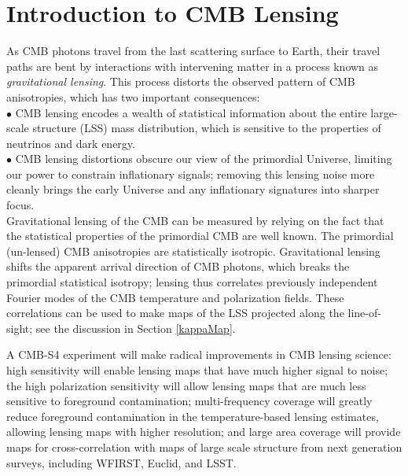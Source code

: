 \section{Introduction to CMB Lensing}
\label{sec:lensing_intro}

As CMB photons travel from the last scattering surface to Earth, their travel paths are bent by interactions with intervening matter in a process known as \textit{gravitational lensing}.
This process distorts the observed pattern of CMB anisotropies, which has two important consequences:\\
 
$\bullet$ CMB lensing encodes a wealth of statistical information about the entire large-scale structure (LSS) mass distribution, which is sensitive to the properties of neutrinos and dark energy.\\

$\bullet$ CMB lensing distortions obscure our view of the primordial Universe, limiting our power to constrain inflationary signals; removing this lensing noise more cleanly brings the early Universe and any inflationary signatures into sharper focus.\\


Gravitational lensing of the CMB can be measured by relying on the fact that the statistical properties of the primordial CMB are well known.
The primordial (un-lensed) CMB anisotropies are statistically isotropic.
Gravitational lensing shifts the apparent arrival direction of CMB photons, which breaks the primordial statistical isotropy;
lensing thus correlates previously independent Fourier modes of the CMB temperature and polarization fields.
These correlations can be used to make maps of the LSS projected along the line-of-sight; see the discussion in Section \ref{kappaMap}.

A CMB-S4 experiment will make radical improvements in CMB lensing science:
high sensitivity will enable lensing maps that have much higher signal to
noise; the high polarization sensitivity will allow
lensing maps that are much less sensitive to foreground contamination;
multi-frequency coverage will greatly reduce foreground 
contamination in the temperature-based lensing estimates, 
allowing lensing maps with higher resolution; and
large area coverage will provide maps for cross-correlation with maps of large
scale structure from next generation surveys, including WFIRST, Euclid, and LSST.


